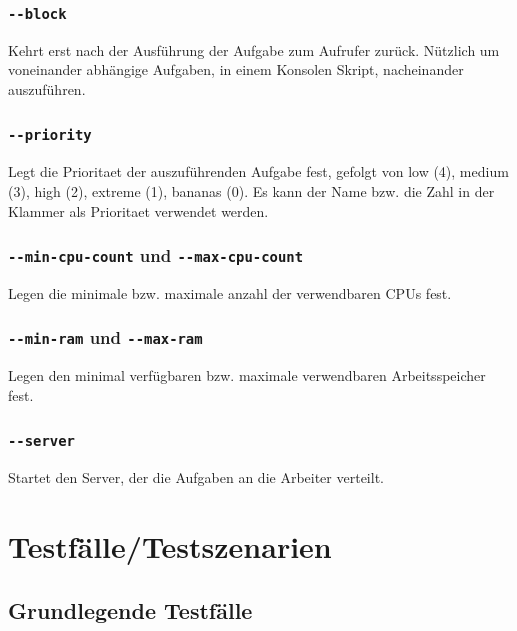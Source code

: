 \documentclass[a4paper,12pt]{article}
\begin{document}
\subsubsection{\texttt{-{}-block}}
Kehrt erst nach der Ausführung der Aufgabe zum Aufrufer zurück. Nützlich um voneinander abhängige Aufgaben, in einem Konsolen Skript, nacheinander auszuführen.

\subsubsection{\texttt{-{}-priority}}
Legt die \gls{Prioritaet} der auszuführenden Aufgabe fest, gefolgt von low (4), medium (3), high (2), extreme (1), bananas (0).
Es kann der Name bzw. die Zahl in der Klammer als \gls{Prioritaet} verwendet werden.

\subsubsection{\texttt{-{}-min-cpu-count} und \texttt{-{}-max-cpu-count}}
Legen die minimale bzw. maximale anzahl der verwendbaren \glspl{CPU} fest.

\subsubsection{\texttt{-{}-min-ram} und \texttt{-{}-max-ram}}
Legen den minimal verfügbaren bzw. maximale verwendbaren Arbeitsspeicher fest.

\subsubsection{\texttt{-{}-server}}
Startet den Server, der die Aufgaben an die Arbeiter verteilt.


\clearpage
\section{Testfälle/Testszenarien}
\subsection{Grundlegende Testfälle}
\end{document}
